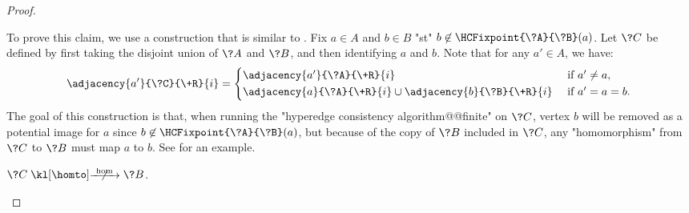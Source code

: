 \begin{proof}
	\begin{marginfigure}
		\centering
		\begin{tikzpicture}
			
		\end{tikzpicture}
		\caption{
			\AP\label{fig:proof-of-hyperedge-consistency-uniform-convergence-hom}
			Construction of $\?C$ as in the proof of  when $\?A$
			is the "$2$-path" and $\?B$ is the "$2$-transitive tournament".
		}
	\end{marginfigure}
	To prove this claim, we use a construction that is similar to .
	Fix $a\in A$ and $b\in B$ "st" $b \not\in \HCFixpoint{\?A}{\?B}(a)$.
	Let $\?C$ be defined by first taking the disjoint union of $\?A$ and $\?B$,
	and then identifying $a$ and $b$.
	Note that for any $a' \in A$, we have:
	\[
		\adjacency{a'}{\?C}{\+R}{i} =
		\begin{cases*}
			\adjacency{a'}{\?A}{\+R}{i} & \text{ if $a' \neq a$,}\\
			\adjacency{a}{\?A}{\+R}{i} \cup \adjacency{b}{\?B}{\+R}{i}  & \text{ if $a' = a = b$.}
		\end{cases*}	
	\]
	The goal of this construction
	is that, when running the "hyperedge consistency algorithm@@finite" on $\?C$,
	vertex $b$ will be removed as a potential image for $a$ since $b \not\in \HCFixpoint{\?A}{\?B}(a)$, but because of the copy of $\?B$ included in $\?C$, any "homomorphism" from $\?C$ to $\?B$ must map $a$ to $b$. See 
	for an example.

	\begin{claim}
		\AP\label{claim:hyperedge-consistency-uniform-convergence-hom-union}
		$\?C \nothomto \?B$.
	\end{claim} 


\end{proof}
